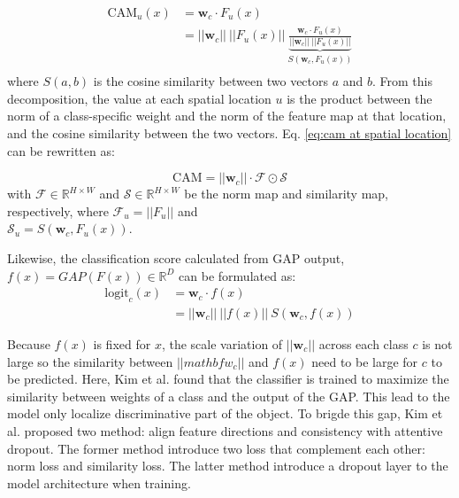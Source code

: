 \documentclass[conference]{IEEEtran}
\begin{document}
\begin{equation} \label{eq:cam at spatial location}
    \begin{split}
        \text{CAM}_u(x) & = \mathbf{w}_c \cdot F_u(x)                                                                                                                \\
                        & = ||\mathbf{w}_c|| ~ || F_u(x) || ~ \underbrace{\frac{\mathbf{w}_c \cdot F_u(x)}{||\mathbf{w}_c|| ~ ||F_u(x)||}}_{S(\mathbf{w}_c, F_u(x))} \\
    \end{split}
\end{equation}
where $S(a, b)$ is the cosine similarity between two vectors $a$ and $b$. From this decomposition, the value at each spatial location $u$ is the product between the norm of a class-specific weight and the norm of the feature map at that location, and the cosine similarity between the two vectors. Eq. \ref{eq:cam at spatial location} can be rewritten as:

\begin{equation} \label{eq:cam with norm and similarity}
    \text{CAM} = ||\mathbf{w}_c|| \cdot \mathcal{F} \odot \mathcal{S}
\end{equation}
with $\mathcal{F} \in \mathbb{R}^{H\times W}$ and $\mathcal{S} \in \mathbb{R}^{H\times W}$ be the norm map and similarity map, respectively, where $\mathcal{F}_u = ||F_u||$ and \\ $\mathcal{S}_u = S(\mathbf{w}_c, F_u(x))$.

Likewise, the classification score calculated from GAP output, $f(x) = GAP(F(x)) \in \mathbb{R}^D$ can be formulated as:
\begin{equation} \label{eq:logit with norm and similarity}
    \begin{split}
        \text{logit}_c(x) & = \mathbf{w}_c \cdot f(x)                             \\
                          & = ||\mathbf{w}_c|| ~ ||f(x)|| ~ S(\mathbf{w}_c, f(x))
    \end{split}
\end{equation}

Because $f(x)$ is fixed for $x$, the scale variation of $||\mathbf{w}_c||$ across each class $c$ is not large so the similarity between $||mathbf{w}_c||$ and $f(x)$ need to be large for $c$ to be predicted. Here, Kim et al. found that the classifier is trained to maximize the similarity between weights of a class and the output of the GAP. This lead to the model only localize discriminative part of the object. To brigde this gap, Kim et al. proposed two method: align feature directions and consistency with attentive dropout. The former method introduce two loss that complement each other: norm loss and similarity loss. The latter method introduce a dropout layer to the model architecture when training.
\end{document}
